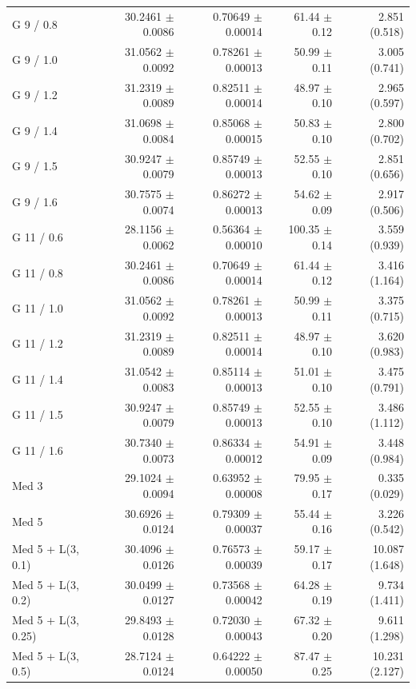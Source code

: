 \begin{longtable}{lrrrr}
G 9 / 0.8 & 30.2461 $\pm$ 0.0086 & 0.70649 $\pm$ 0.00014 & 61.44 $\pm$ 0.12 & 2.851 (0.518) \\
G 9 / 1.0 & 31.0562 $\pm$ 0.0092 & 0.78261 $\pm$ 0.00013 & 50.99 $\pm$ 0.11 & 3.005 (0.741) \\
G 9 / 1.2 & 31.2319 $\pm$ 0.0089 & 0.82511 $\pm$ 0.00014 & 48.97 $\pm$ 0.10 & 2.965 (0.597) \\
G 9 / 1.4 & 31.0698 $\pm$ 0.0084 & 0.85068 $\pm$ 0.00015 & 50.83 $\pm$ 0.10 & 2.800 (0.702) \\
G 9 / 1.5 & 30.9247 $\pm$ 0.0079 & 0.85749 $\pm$ 0.00013 & 52.55 $\pm$ 0.10 & 2.851 (0.656) \\
G 9 / 1.6 & 30.7575 $\pm$ 0.0074 & 0.86272 $\pm$ 0.00013 & 54.62 $\pm$ 0.09 & 2.917 (0.506) \\
G 11 / 0.6 & 28.1156 $\pm$ 0.0062 & 0.56364 $\pm$ 0.00010 & 100.35 $\pm$ 0.14 & 3.559 (0.939) \\
G 11 / 0.8 & 30.2461 $\pm$ 0.0086 & 0.70649 $\pm$ 0.00014 & 61.44 $\pm$ 0.12 & 3.416 (1.164) \\
G 11 / 1.0 & 31.0562 $\pm$ 0.0092 & 0.78261 $\pm$ 0.00013 & 50.99 $\pm$ 0.11 & 3.375 (0.715) \\
G 11 / 1.2 & 31.2319 $\pm$ 0.0089 & 0.82511 $\pm$ 0.00014 & 48.97 $\pm$ 0.10 & 3.620 (0.983) \\
G 11 / 1.4 & 31.0542 $\pm$ 0.0083 & 0.85114 $\pm$ 0.00013 & 51.01 $\pm$ 0.10 & 3.475 (0.791) \\
G 11 / 1.5 & 30.9247 $\pm$ 0.0079 & 0.85749 $\pm$ 0.00013 & 52.55 $\pm$ 0.10 & 3.486 (1.112) \\
G 11 / 1.6 & 30.7340 $\pm$ 0.0073 & 0.86334 $\pm$ 0.00012 & 54.91 $\pm$ 0.09 & 3.448 (0.984) \\
Med 3 & 29.1024 $\pm$ 0.0094 & 0.63952 $\pm$ 0.00008 & 79.95 $\pm$ 0.17 & 0.335 (0.029) \\
Med 5 & 30.6926 $\pm$ 0.0124 & 0.79309 $\pm$ 0.00037 & 55.44 $\pm$ 0.16 & 3.226 (0.542) \\
Med 5 + L(3, 0.1) & 30.4096 $\pm$ 0.0126 & 0.76573 $\pm$ 0.00039 & 59.17 $\pm$ 0.17 & 10.087 (1.648) \\
Med 5 + L(3, 0.2) & 30.0499 $\pm$ 0.0127 & 0.73568 $\pm$ 0.00042 & 64.28 $\pm$ 0.19 & 9.734 (1.411) \\
Med 5 + L(3, 0.25) & 29.8493 $\pm$ 0.0128 & 0.72030 $\pm$ 0.00043 & 67.32 $\pm$ 0.20 & 9.611 (1.298) \\
Med 5 + L(3, 0.5) & 28.7124 $\pm$ 0.0124 & 0.64222 $\pm$ 0.00050 & 87.47 $\pm$ 0.25 & 10.231 (2.127) \\

\end{longtable}
